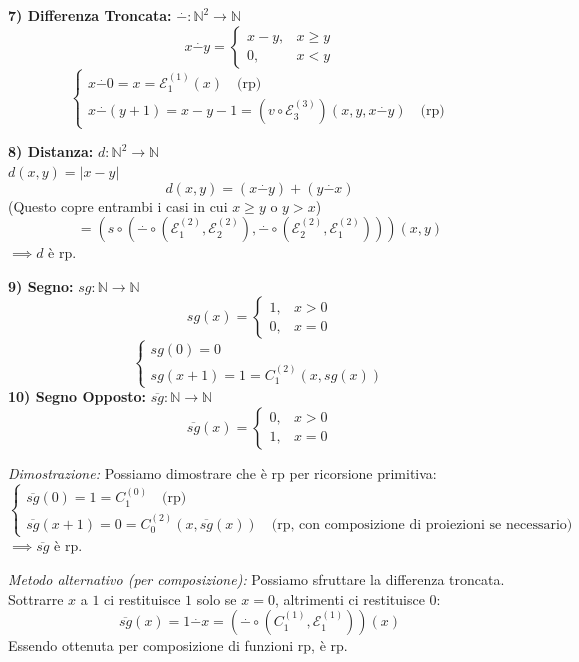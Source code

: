 \vspace{0.4cm}
\textbf{7) Differenza Troncata:} $\overset{\cdot}{-} : \mathbb{N}^2 \to \mathbb{N}$
$$
x \overset{\cdot}{-} y = \begin{cases} 
x-y, & x \ge y \\ 
0, & x < y 
\end{cases}
$$
$$
\begin{cases} 
x \overset{\cdot}{-} 0 = x = \mathcal{E}_1^{(1)}(x) \quad \text{(rp)} \\ 
x \overset{\cdot}{-} (y+1) = x-y-1 = \left( v \circ \mathcal{E}_3^{(3)} \right)(x, y, x \overset{\cdot}{-} y) \quad \text{(rp)}
\end{cases}
$$

\vspace{0.4cm}
\textbf{8) Distanza:} $d : \mathbb{N}^2 \to \mathbb{N}$ \\
$d(x,y) = |x-y|$
$$ d(x,y) = (x \overset{\cdot}{-} y) + (y \overset{\cdot}{-} x) $$
(Questo copre entrambi i casi in cui $x \ge y$ o $y > x$)
$$ = \left( s \circ (\overset{\cdot}{-} \circ (\mathcal{E}_1^{(2)}, \mathcal{E}_2^{(2)}), \overset{\cdot}{-} \circ (\mathcal{E}_2^{(2)}, \mathcal{E}_1^{(2)})) \right)(x,y) $$
$\implies d$ è rp.

\vspace{0.4cm}
\textbf{9) Segno:} $sg : \mathbb{N} \to \mathbb{N}$
$$
sg(x) = \begin{cases} 
1, & x > 0 \\ 
0, & x = 0 
\end{cases}
$$
$$
\begin{cases} 
sg(0) = 0 \\ 
sg(x+1) = 1 = C_1^{(2)}(x, sg(x)) 
\end{cases}
$$
\textbf{10) Segno Opposto:} $\overline{sg} : \mathbb{N} \to \mathbb{N}$
$$
\overline{sg}(x) = \begin{cases} 
0, & x > 0 \\ 
1, & x = 0 
\end{cases}
$$

\textit{Dimostrazione:}
Possiamo dimostrare che è rp per ricorsione primitiva:
$$
\begin{cases} 
\overline{sg}(0) = 1 = C_1^{(0)} \quad \text{(rp)} \\ 
\overline{sg}(x+1) = 0 = C_0^{(2)}(x, \overline{sg}(x)) \quad \text{(rp, con composizione di proiezioni se necessario)}
\end{cases}
$$
$\implies \overline{sg}$ è rp.

\textit{Metodo alternativo (per composizione):}
Possiamo sfruttare la differenza troncata. Sottrarre $x$ a $1$ ci restituisce $1$ solo se $x=0$, altrimenti ci restituisce $0$:
$$ \overline{sg}(x) = 1 \overset{\cdot}{-} x = \left( \overset{\cdot}{-} \circ (C_1^{(1)}, \mathcal{E}_1^{(1)}) \right)(x) $$
Essendo ottenuta per composizione di funzioni rp, è rp.

